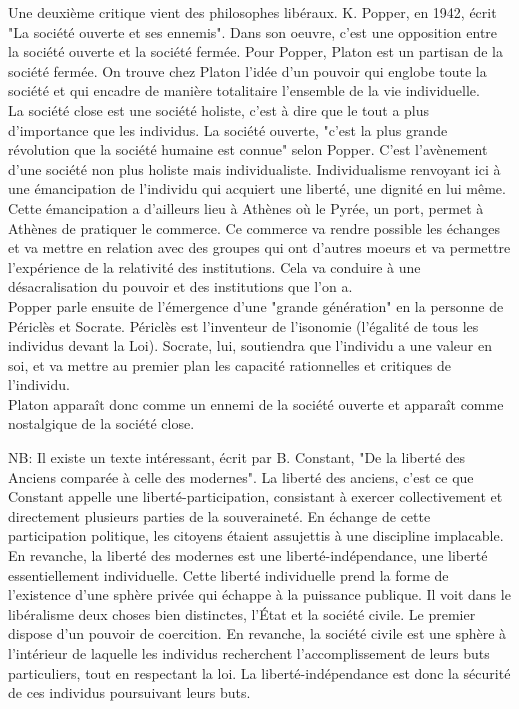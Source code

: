 \documentclass[10pt, a4paper, openany]{book}
\begin{document}
Une deuxième critique vient des philosophes libéraux. K. Popper, en 1942, écrit "La société ouverte et ses ennemis". Dans son oeuvre, c'est une opposition entre la société ouverte et la société fermée. Pour Popper, Platon est un partisan de la société fermée. On trouve chez Platon l'idée d'un pouvoir qui englobe toute la société et qui encadre de manière totalitaire l'ensemble de la vie individuelle. \\
La société close est une société holiste, c'est à dire que le tout a plus d'importance que les individus. La société ouverte, "c'est la plus grande révolution que la société humaine est connue" selon Popper. C'est l'avènement d'une société non plus holiste mais individualiste. Individualisme renvoyant ici à une émancipation de l'individu qui acquiert une liberté, une dignité en lui même. \\
Cette émancipation a d'ailleurs lieu à Athènes où le Pyrée, un port, permet à Athènes de pratiquer le commerce. Ce commerce va rendre possible les échanges et va mettre en relation avec des groupes qui ont d'autres moeurs et va permettre l'expérience de la relativité des institutions. Cela va conduire à une désacralisation du pouvoir et des institutions que l'on a. \\
Popper parle ensuite de l'émergence d'une "grande génération" en la personne de Périclès et Socrate. Périclès est l'inventeur de l'isonomie (l'égalité de tous les individus devant la Loi). Socrate, lui, soutiendra que l'individu a une valeur en soi, et va mettre au premier plan les capacité rationnelles et critiques de l'individu. \\
Platon apparaît donc comme un ennemi de la société ouverte et apparaît comme nostalgique de la société close. 


NB: Il existe un texte intéressant, écrit par B. Constant, "De la liberté des Anciens comparée à celle des modernes". La liberté des anciens, c'est ce que Constant appelle une liberté-participation, consistant à exercer collectivement et directement plusieurs parties de la souveraineté. En échange de cette participation politique, les citoyens étaient assujettis à une discipline implacable. \\
En revanche, la liberté des modernes est une liberté-indépendance, une liberté essentiellement individuelle. Cette liberté individuelle prend la forme de l'existence d'une sphère privée qui échappe à la puissance publique. Il voit dans le libéralisme deux choses bien distinctes, l'État et la société civile. Le premier dispose d'un pouvoir de coercition. En revanche, la société civile est une sphère à l'intérieur de laquelle les individus recherchent l'accomplissement de leurs buts particuliers, tout en respectant la loi. La liberté-indépendance est donc la sécurité de ces individus poursuivant leurs buts. 
\end{document}
